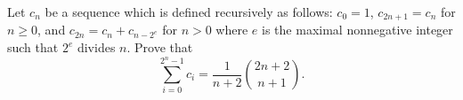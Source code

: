Let $c_n$ be a sequence which is defined recursively as follows: $c_0 = 1$, $c_{2n+1} = c_n$ for $n \geq 0$, and $c_{2n} = c_n + c_{n-2^e}$ for $n > 0$ where $e$ is the maximal nonnegative integer such that $2^e$ divides $n$. Prove that \[\sum_{i=0}^{2^n-1} c_i = \frac{1}{n+2} {2n+2 \choose n+1}.\]